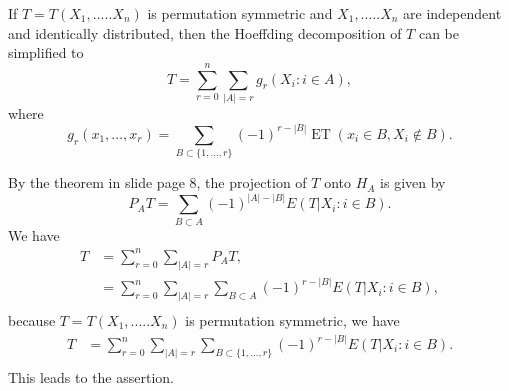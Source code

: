 \begin{problem}

    If $T = T (X_1, . . . ..X_n)$ is permutation symmetric and $X_1, . . . ..X_n$ are independent and identically distributed, then the Hoeffding decomposition of $T$ can be simplified to 
    \begin{equation*}
        T=\sum_{r=0}^{n} \sum_{|A|=r} g_{r}\left(X_{i}: i \in A\right),
    \end{equation*}
    where 
    \begin{equation*}
        g_{r}\left(x_{1}, \ldots, x_{r}\right)=\sum_{B \subset\{1, \ldots, r\}}(-1)^{r-|B|} \operatorname{ET}\left(x_{i} \in B, X_{i} \notin B\right).
    \end{equation*}
\end{problem}


\begin{solution}
    By the theorem in slide page 8, the projection of $T$ onto $H_{A}$ is given by
    \begin{equation*}
        P_{A} T = \sum_{B \subset A} (-1)^{|A|-|B|} E\left(T | X_{i}: i \in B\right).
    \end{equation*}
    We have 
    \begin{equation*}
        \begin{split}
            T & = \sum_{r=0}^n \sum_{|A|=r} P_{A} T ,\\
            & =  \sum_{r=0}^n \sum_{|A|=r} \sum_{B\subset A} (-1)^{r-|B|} E\left(T | X_{i}: i \in B\right) ,\\
        \end{split}
    \end{equation*}
    because $T = T (X_1, . . . ..X_n)$ is permutation symmetric, we have
    \begin{equation*}
        \begin{split}
            T 
            & =  \sum_{r=0}^n \sum_{|A|=r} \sum_{B\subset \{1,\dots,r\}} (-1)^{r-|B|} E\left(T | X_{i}: i \in B\right). \\
        \end{split}
    \end{equation*}
    This leads to the assertion.
\end{solution}




